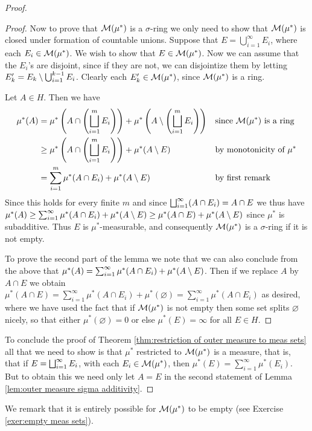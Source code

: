 \begin{proof}
\begin{proof}
Now to prove that ${\cal M}(\mu^*)$ is a $\sigma$-ring we only need to show that ${\cal M}(\mu^*)$ is closed under formation of countable unions. Suppose that $E=\bigcup_{i=1}^\infty E_i$, where each $E_i\in{\cal M}(\mu^*)$. We wish to show that $E\in{\cal M}(\mu^*)$. Now we can assume that the $E_i$'s are disjoint, since if they are not, we can disjointize them by letting $E_k'=E_k\setminus\bigcup_{i=1}^{k-1} E_i$. Clearly each $E_k'\in{\cal M}(\mu^*)$, since ${\cal M}(\mu^*)$ is a ring.

Let $A\in H$. Then we have
\begin{align*}
    \mu^*(A)&=\mu^*\left(A\cap\left(\bigsqcup_{i=1}^mE_i\right)\right)+\mu^*\left(A\setminus\left(\bigsqcup_{i=1}^mE_i\right)\right)& &\text{since }{\cal M}(\mu^*)\text{ is a ring}\\
            &\geq\mu^*\left(A\cap\left(\bigsqcup_{i=1}^mE_i\right)\right)+\mu^*(A\setminus E)& &\text{by monotonicity of }\mu^*\\
            &=\sum_{i=1}^m\mu^*(A\cap E_i)+\mu^*(A\setminus E)& &\text{by first remark}
\end{align*}
Since this holds for every finite $m$ and since $\bigsqcup_{i=1}^\infty(A\cap E_i)=A\cap E$ we thus have $\mu^*(A)\geq\sum_{i=1}^\infty\mu^*(A\cap E_i)+\mu^*(A\setminus E)\geq\mu^*(A\cap E)+\mu^*(A\setminus E)$ since $\mu^*$ is subadditive. Thus $E$ is $\mu^*$-measurable, and consequently ${\cal M}(\mu^*)$ is a $\sigma$-ring if it is not empty.

To prove the second part of the lemma we note that we can also conclude from the above that $\mu^*(A)=\sum_{i=1}^\infty\mu^*(A\cap E_i)+\mu^*(A\setminus E)$. Then if we replace $A$ by $A\cap E$ we obtain $\mu^*(A\cap E)=\sum_{i=1}^\infty\mu^*(A\cap E_i)+\mu^*(\varnothing)=\sum_{i=1}^\infty\mu^*(A\cap E_i)$ as desired, where we have used the fact that if ${\cal M}(\mu^*)$ is not empty then some set splits $\varnothing$ nicely, so that either $\mu^*(\varnothing)=0$ or else $\mu^*(E)=\infty$ for all $E\in H$.
\end{proof}

To conclude the proof of Theorem \ref{thm:restriction of outer measure to meas sets} all that we need to show is that $\mu^*$ restricted to ${\cal M}(\mu^*)$ is a measure, that is, that if $E=\bigsqcup_{i=1}^\infty E_i$, with each $E_i\in{\cal M}(\mu^*)$, then $\mu^*(E)=\sum_{i=1}^\infty\mu^*(E_i)$. But to obtain this we need only let $A=E$ in the second statement of Lemma \ref{lem:outer measure sigma additivity}.
\end{proof}

We remark that it is entirely possible for ${\cal M}(\mu^*)$ to be empty (see Exercise \ref{exer:empty meas sets}).


